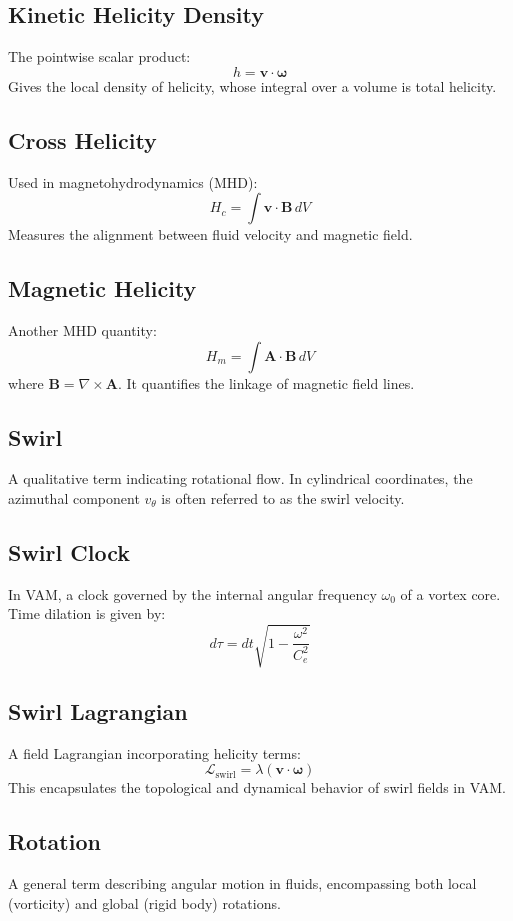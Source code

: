 \documentclass[a4paper, aps,preprint,superscriptaddress, 12pt]{revtex4}
\begin{document}
    \subsection*{Kinetic Helicity Density}
    The pointwise scalar product:
    \[ h = \mathbf{v} \cdot \boldsymbol{\omega} \]
    Gives the local density of helicity, whose integral over a volume is total helicity.

    \subsection*{Cross Helicity}
    Used in magnetohydrodynamics (MHD):
    \[ H_c = \int \mathbf{v} \cdot \mathbf{B} \, dV \]
    Measures the alignment between fluid velocity and magnetic field.

    \subsection*{Magnetic Helicity}
    Another MHD quantity:
    \[ H_m = \int \mathbf{A} \cdot \mathbf{B} \, dV \]
    where $\mathbf{B} = \nabla \times \mathbf{A}$. It quantifies the linkage of magnetic field lines.

    \subsection*{Swirl}
    A qualitative term indicating rotational flow. In cylindrical coordinates, the azimuthal component $v_\theta$ is often referred to as the swirl velocity.

    \subsection*{Swirl Clock}
    In VAM, a clock governed by the internal angular frequency $\omega_0$ of a vortex core. Time dilation is given by:
    \[ d\tau = dt \sqrt{1 - \frac{\omega^2}{C_e^2}} \]

    \subsection*{Swirl Lagrangian}
    A field Lagrangian incorporating helicity terms:
    \[ \mathcal{L}_{\text{swirl}} = \lambda (\mathbf{v} \cdot \boldsymbol{\omega}) \]
    This encapsulates the topological and dynamical behavior of swirl fields in VAM.

    \subsection*{Rotation}
    A general term describing angular motion in fluids, encompassing both local (vorticity) and global (rigid body) rotations.
\end{document}
